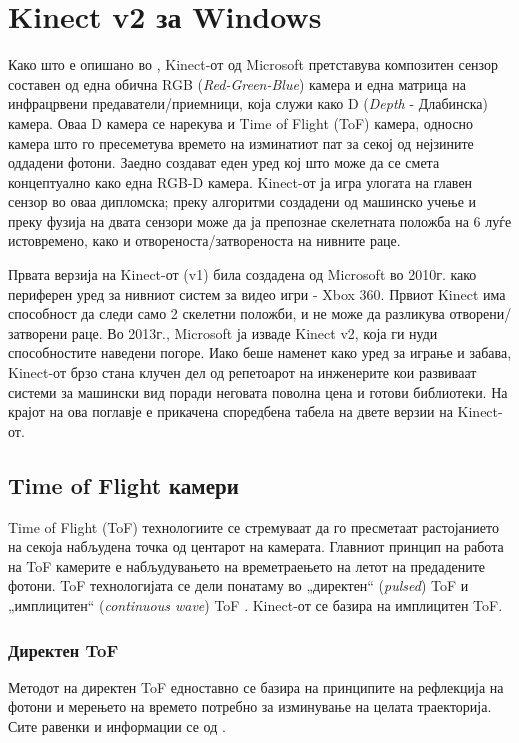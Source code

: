 \documentclass[11pt]{article}
\begin{document}
\newpage

\section{Kinect v2 за Windows}
	Како што е опишано во \cite{wassenmuller}, Kinect-от од Microsoft претставува композитен сензор составен од една обична RGB (\textit{Red-Green-Blue}) камера и една матрица на инфрацрвени предаватели/приемници, која служи како D (\textit{Depth} - Длабинска) камера. Оваа D камера се нарекува и Time of Flight (ToF) камера, односно камера што го пресеметува времето на изминатиот пат за секој од нејзините оддадени фотони. Заедно создават еден уред кој што може да се смета концептуално како една RGB-D камера. Kinect-от ја игра улогата на главен сензор во оваа дипломска; преку алгоритми создадени од машинско учење и преку фузија на двата сензори може да ја препознае скелетната положба на 6 луѓе истовремено, како и отвореноста/затвореноста на нивните раце.

	Првата верзија на Kinect-от (v1) била создадена од Microsoft во 2010г. како периферен уред за нивниот систем за видео игри - Xbox 360. Првиот Kinect има способност да следи само 2 скелетни положби, и не може да разликува отворени/затворени раце. Во 2013г., Microsoft ја изваде Kinect v2, која ги нуди способностите наведени погоре. Иако беше наменет како уред за играње и забава, Kinect-от брзо стана клучен дел од репетоарот на инженерите кои развиваат системи за машински вид поради неговата поволна цена и готови библиотеки. На крајот на ова поглавје е прикачена споредбена табела на двете верзии на Kinect-от.
  \subsection{Time of Flight камери}
  	Time of Flight (ToF) технологиите се стремуваат да го пресметаат растојанието на секоја набљудена точка од центарот на камерата. Главниот принцип на работа на ToF камерите е набљудувањето на времетраењето на летот на предадените фотони. ToF технологијата се дели понатаму во „директен“ (\textit{pulsed}) ToF и „имплицитен“ (\textit{continuous wave}) ToF \cite{tofwhitepaper}. Kinect-от се базира на имплицитен ToF.

	  \subsubsection{Директен ToF}

		Методот на директен ToF едноставно се базира на принципите на рефлекција на фотони и мерењето на времето потребно за изминување на целата траекторија. Сите равенки и информации се од \cite{tofwhitepaper}.
\end{document}
